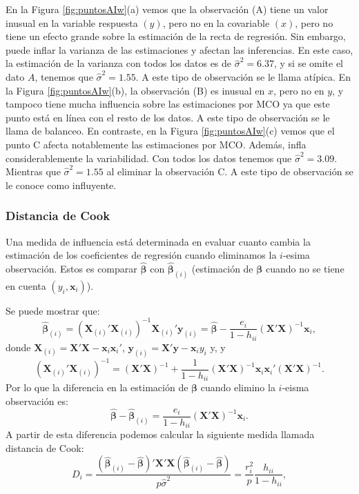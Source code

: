 \documentclass[
]{article}
\begin{document}
En la Figura \ref{fig:puntosAIw}(a) vemos que la observación (A) tiene un valor inusual en la variable respuesta \((y)\), pero no en la covariable \((x)\), pero no tiene un efecto grande sobre la estimación de la recta de regresión. Sin embargo, puede inflar la varianza de las estimaciones y afectan las inferencias. En este caso, la estimación de la varianza con todos los datos es de \(\widehat{\sigma}^{2}=6.37\), y si se omite el dato \(A\), tenemos que \(\widehat{\sigma}^{2}=1.55\). A este tipo de observación se le llama atípica. En la Figura \ref{fig:puntosAIw}(b), la observación (B) es inusual en \(x\), pero no en \(y\), y tampoco tiene mucha influencia sobre las estimaciones por MCO ya que este punto está en línea con el resto de los datos. A este tipo de observación se le llama de balanceo. En contraste, en la Figura \ref{fig:puntosAIw}(c) vemos que el punto C afecta notablemente las estimaciones por MCO. Además, infla considerablemente la variabilidad. Con todos los datos tenemos que \(\widehat{\sigma}^{2}=3.09\). Mientras que \(\widehat{\sigma}^{2}=1.55\) al eliminar la observación C. A este tipo de observación se le conoce como influyente.

\subsubsection{Distancia de Cook}\label{distancia-de-cook}

Una medida de influencia está determinada en evaluar cuanto cambia la estimación de los coeficientes de regresión cuando eliminamos la \(i\)-esima observación. Estos es comparar \(\widehat{\boldsymbol \beta}\) con \(\widehat{\boldsymbol \beta}_{(i)}\) (estimación de \(\boldsymbol \beta\) cuando no se tiene en cuenta \((y_i,\boldsymbol x_i)\)).

Se puede mostrar que:
\[
\widehat{\boldsymbol \beta}_{(i)} = (\boldsymbol X_{(i)}'\boldsymbol X_{(i)})^{-1} \boldsymbol X_{(i)}'\boldsymbol y_{(i)} = \widehat{\boldsymbol \beta}- \frac{e_i}{1-h_{ii}}(\boldsymbol X'\boldsymbol X)^{-1}\boldsymbol x_i,
\]
donde \(\boldsymbol X_{(i)} = \boldsymbol X'\boldsymbol X- \boldsymbol x_i\boldsymbol x_i'\), \(\boldsymbol y_{(i)}= \boldsymbol X'\boldsymbol y- \boldsymbol x_iy_i\) y,
y
\[
\left(\boldsymbol X_{(i)}'\boldsymbol X_{(i)}\right)^{-1} = (\boldsymbol X'\boldsymbol X)^{-1} + \frac{1}{1-h_{ii}} (\boldsymbol X'\boldsymbol X)^{-1}\boldsymbol x_i\boldsymbol x_i'(\boldsymbol X'\boldsymbol X)^{-1}.
\]
Por lo que la diferencia en la estimación de \(\boldsymbol \beta\) cuando elimino la \(i\)-eisma observación es:
\[
\widehat{\boldsymbol \beta}- \widehat{\boldsymbol \beta}_{(i)} = \frac{e_i}{1-h_{ii}}(\boldsymbol X'\boldsymbol X)^{-1}\boldsymbol x_i.
\]
A partir de esta diferencia podemos calcular la siguiente medida llamada distancia de Cook:
\[
D_{i} = \frac{(\widehat{\boldsymbol \beta}_{(i)}-\widehat{\boldsymbol \beta})'\boldsymbol X'\boldsymbol X(\widehat{\boldsymbol \beta}_{(i)}-\widehat{\boldsymbol \beta})}{p \hat{\sigma}^{2}} = \frac{r_{i}^{2}}{p}\frac{h_{ii}}{1-h_{ii}},
\]
\end{document}
